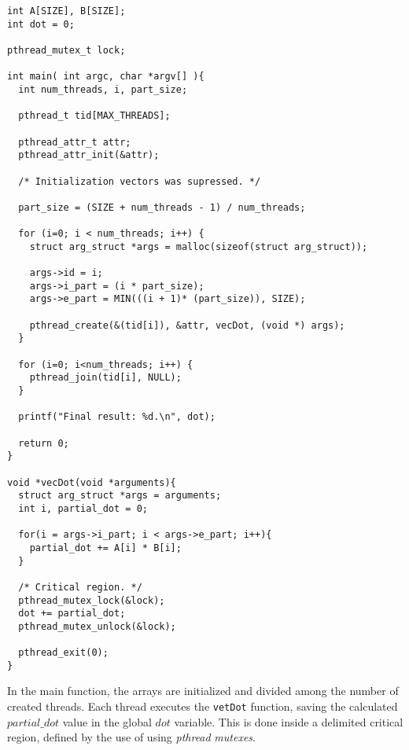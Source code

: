 \begin{lstlisting}[style=C, label=cod:sample:vetdot:pthreads,caption=The vetdot sample using pthreads.]
int A[SIZE], B[SIZE];
int dot = 0;

pthread_mutex_t lock;

int main( int argc, char *argv[] ){
  int num_threads, i, part_size;
  
  pthread_t tid[MAX_THREADS];
	
  pthread_attr_t attr;
  pthread_attr_init(&attr);
	
  /* Initialization vectors was supressed. */
	
  part_size = (SIZE + num_threads - 1) / num_threads;
	
  for (i=0; i < num_threads; i++) {
  	struct arg_struct *args = malloc(sizeof(struct arg_struct));
		
  	args->id = i;
  	args->i_part = (i * part_size);
  	args->e_part = MIN(((i + 1)* (part_size)), SIZE);
  	
  	pthread_create(&(tid[i]), &attr, vecDot, (void *) args);
  }
	
  for (i=0; i<num_threads; i++) {
  	pthread_join(tid[i], NULL);
  }
	
  printf("Final result: %d.\n", dot);
	
  return 0;
}

void *vecDot(void *arguments){
  struct arg_struct *args = arguments;
  int i, partial_dot = 0;	
	
  for(i = args->i_part; i < args->e_part; i++){ 
  	partial_dot += A[i] * B[i]; 
  }
	
  /* Critical region. */
  pthread_mutex_lock(&lock);
  dot += partial_dot;
  pthread_mutex_unlock(&lock);
	
  pthread_exit(0);
}
\end{lstlisting}

In the main function, the arrays are initialized and divided among the number of created threads. Each thread executes the \texttt{vetDot} function, saving the calculated $partial\_dot$ value in the global $dot$ variable. This is done inside a delimited critical region, defined by the use of using \textit{pthread} \textit{mutexes}.